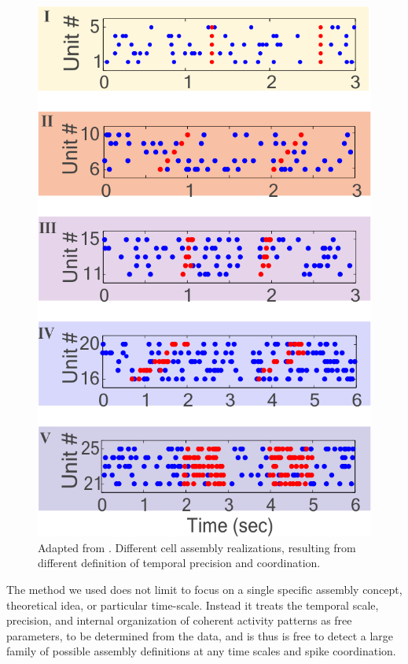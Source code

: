 \begin{figure}
    \centering
    \includegraphics[scale=0.3]{figures/CellAssembliesZoom.png}
    \caption{Adapted from \cite{RussoDurstewitz}. Different cell assembly realizations, resulting from different definition of temporal precision and coordination.}
    \label{fig:CellAsseDet}
\end{figure}
The method we used does not limit to focus on a single specific assembly concept, theoretical idea, or particular time-scale. Instead it treats the temporal scale, precision, and internal organization of coherent activity patterns as free parameters, to be determined from the data, and is thus is free to detect a large family of possible assembly definitions at any time scales and spike coordination.\\
